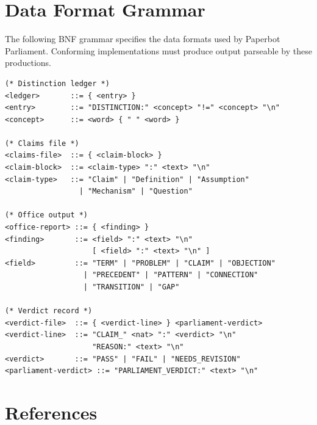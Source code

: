 \documentclass[12pt, a4paper]{article}
\theoremstyle{principle}
\theoremstyle{definition}
\begin{document}
\appendix
\section{Data Format Grammar}

The following BNF grammar specifies the data formats used by Paperbot Parliament.
Conforming implementations must produce output parseable by these productions.

\begin{lstlisting}[language={}, caption={BNF for Parliament data formats}]
(* Distinction ledger *)
<ledger>       ::= { <entry> }
<entry>        ::= "DISTINCTION:" <concept> "!=" <concept> "\n"
<concept>      ::= <word> { " " <word> }

(* Claims file *)
<claims-file>  ::= { <claim-block> }
<claim-block>  ::= <claim-type> ":" <text> "\n"
<claim-type>   ::= "Claim" | "Definition" | "Assumption"
                 | "Mechanism" | "Question"

(* Office output *)
<office-report> ::= { <finding> }
<finding>       ::= <field> ":" <text> "\n"
                    [ <field> ":" <text> "\n" ]
<field>         ::= "TERM" | "PROBLEM" | "CLAIM" | "OBJECTION"
                  | "PRECEDENT" | "PATTERN" | "CONNECTION"
                  | "TRANSITION" | "GAP"

(* Verdict record *)
<verdict-file>  ::= { <verdict-line> } <parliament-verdict>
<verdict-line>  ::= "CLAIM_" <nat> ":" <verdict> "\n"
                    "REASON:" <text> "\n"
<verdict>       ::= "PASS" | "FAIL" | "NEEDS_REVISION"
<parliament-verdict> ::= "PARLIAMENT_VERDICT:" <text> "\n"
\end{lstlisting}

\section*{References}
\end{document}
